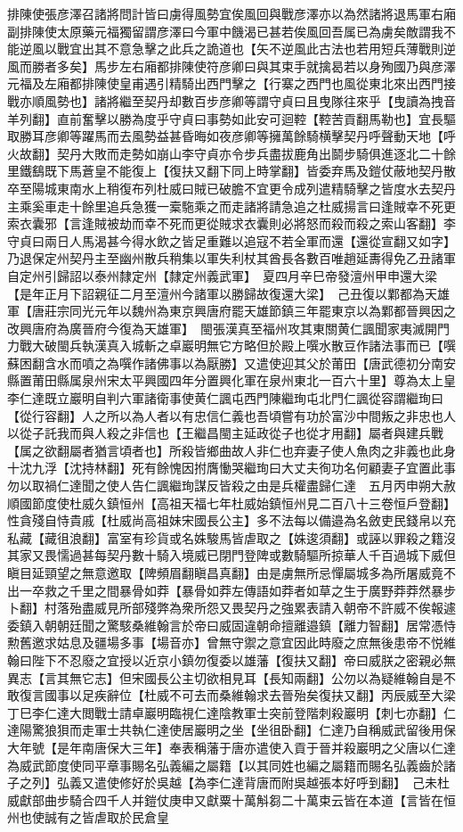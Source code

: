 排陳使張彦澤召諸將問計皆曰虜得風勢宜俟風回與戰彦澤亦以為然諸將退馬軍右廂副排陳使太原藥元福獨留謂彦澤曰今軍中饑渴已甚若俟風回吾属已為虜矣敵謂我不能逆風以戰宜出其不意急擊之此兵之詭道也【矢不逆風此古法也若用短兵薄戰則逆風而勝者多矣】馬步左右廂都排陳使符彦卿曰與其束手就擒曷若以身殉國乃與彦澤元福及左廂都排陳使皇甫遇引精騎出西門擊之【行寨之西門也風從東北來出西門接戰亦順風勢也】諸將繼至契丹却數百步彦卿等謂守貞曰且曳隊往來乎【曳讀為拽音羊列翻】直前奮擊以勝為度乎守貞曰事勢如此安可迴鞚【鞚苦貢翻馬勒也】宜長驅取勝耳彦卿等躍馬而去風勢益甚昏晦如夜彦卿等擁萬餘騎横擊契丹呼聲動天地【呼火故翻】契丹大敗而走勢如崩山李守貞亦令步兵盡拔鹿角出鬬步騎俱進逐北二十餘里鐵鷂既下馬蒼皇不能復上【復扶又翻下同上時掌翻】皆委弃馬及鎧仗蔽地契丹散卒至陽城東南水上稍復布列杜威曰賊已破膽不宜更令成列遣精騎擊之皆度水去契丹主乘奚車走十餘里追兵急獲一槖駞乘之而走諸將請急追之杜威揚言曰逢賊幸不死更索衣囊邪【言逢賊被劫而幸不死而更從賊求衣囊則必將怒而殺而殺之索山客翻】李守貞曰兩日人馬渴甚今得水飲之皆足重難以追寇不若全軍而還【還從宣翻又如字】乃退保定州契丹主至幽州散兵稍集以軍失利杖其酋長各數百唯趙延夀得免乙丑諸軍自定州引歸詔以泰州隸定州【隸定州義武軍】　夏四月辛巳帝發澶州甲申還大梁【是年正月下詔親征二月至澶州今諸軍以勝歸故復還大梁】　己丑復以鄴都為天雄軍【唐莊宗同光元年以魏州為東京興唐府罷天雄節鎮三年罷東京以為鄴都晉興因之改興唐府為廣晉府今復為天雄軍】　閩張漢真至福州攻其東關黄仁諷聞家夷滅開門力戰大破閩兵執漢真入城斬之卓巖明無它方略但於殿上噀水散豆作諸法事而已【噀蘇困翻含水而噴之為噀作諸佛事以為厭勝】又遣使迎其父於莆田【唐武德初分南安縣置莆田縣属泉州宋太平興國四年分置興化軍在泉州東北一百六十里】尊為太上皇李仁達既立巖明自判六軍諸衛事使黄仁諷屯西門陳繼珣屯北門仁諷從容謂繼珣曰【從行容翻】人之所以為人者以有忠信仁義也吾頃嘗有功於富沙中間叛之非忠也人以從子託我而與人殺之非信也【王繼昌閩主延政從子也從才用翻】屬者與建兵戰【属之欲翻屬者猶言頃者也】所殺皆鄉曲故人非仁也弃妻子使人魚肉之非義也此身十沈九浮【沈持林翻】死有餘愧因拊膺慟哭繼珣曰大丈夫徇功名何顧妻子宜置此事勿以取禍仁達聞之使人告仁諷繼珣謀反皆殺之由是兵權盡歸仁達　五月丙申朔大赦　順國節度使杜威久鎮恒州【高祖天福七年杜威始鎮恒州見二百八十三卷恒戶登翻】性貪殘自恃貴戚【杜威尚高祖妹宋國長公主】多不法每以備邉為名斂吏民錢帛以充私藏【藏徂浪翻】富室有珍貨或名姝駿馬皆虐取之【姝逡須翻】或誣以罪殺之籍沒其家又畏懦過甚每契丹數十騎入境威已閉門登陴或數騎驅所掠華人千百過城下威但瞋目延頸望之無意邀取【陴頻眉翻瞋昌真翻】由是虜無所忌憚屬城多為所屠威竟不出一卒救之千里之間暴骨如莽【暴骨如莽左傳語如莽者如草之生于廣野莽莽然暴步卜翻】村落殆盡威見所部殘弊為衆所怨又畏契丹之強累表請入朝帝不許威不俟報遽委鎮入朝朝廷聞之驚駭桑維翰言於帝曰威固違朝命擅離邉鎮【離力智翻】居常憑恃勲舊邀求姑息及疆場多事【場音亦】曾無守禦之意宜因此時廢之庶無後患帝不悦維翰曰陛下不忍廢之宜授以近京小鎮勿復委以雄藩【復扶又翻】帝曰威朕之密親必無異志【言其無它志】但宋國長公主切欲相見耳【長知兩翻】公勿以為疑維翰自是不敢復言國事以足疾辭位【杜威不可去而桑維翰求去晉殆矣復扶又翻】丙辰威至大梁　丁巳李仁達大閲戰士請卓巖明臨視仁達陰教軍士突前登階刺殺巖明【刺七亦翻】仁達陽驚狼狽而走軍士共執仁達使居巖明之坐【坐徂卧翻】仁達乃自稱威武留後用保大年號【是年南唐保大三年】奉表稱藩于唐亦遣使入貢于晉并殺巖明之父唐以仁達為威武節度使同平章事賜名弘義編之屬籍【以其同姓也編之屬籍而賜名弘義齒於諸子之列】弘義又遣使修好於吳越【為李仁達背唐而附吳越張本好呼到翻】　己未杜威獻部曲步騎合四千人并鎧仗庚申又獻粟十萬斛芻二十萬束云皆在本道【言皆在恒州也使誠有之皆虐取於民倉皇